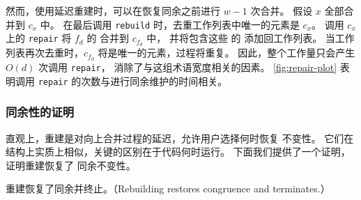 然而，使用延迟重建时，可以在恢复同余之前进行 $w-1$ 次合并。
假设 $x$ 全部合并到 \eclass $c_{x}$ 中。
在最后调用 \texttt{rebuild} 时，去重工作列表中唯一的元素是 $c_{x}$。
调用 $c_{x}$ 上的 \texttt{repair} 将 $f_{d}$ 的 \eclasses 合并到 \eclass $c_{f_{d}}$ 中，
  并将包含这些 \enodes 的 \eclasses 添加回工作列表。
当工作列表再次去重时，$c_{f_{d}}$ 将是唯一的元素，过程将重复。
因此，整个工作量只会产生 $O(d)$ 次调用 \texttt{repair}，
  消除了与这组术语宽度相关的因素。
\autoref{fig:repair-plot} 表明调用 \texttt{repair} 的次数与进行同余维护的时间相关。


\subsubsection{同余性的证明}

直观上，重建是对向上合并过程的延迟，允许用户选择何时恢复 \egraph 不变性。
它们在结构上实质上相似，关键的区别在于代码何时运行。
下面我们提供了一个证明，证明重建恢复了 \egraph 同余不变性。

\begin{theorem}
  重建恢复了同余并终止。（Rebuilding restores congruence and terminates.） %
\end{theorem}

